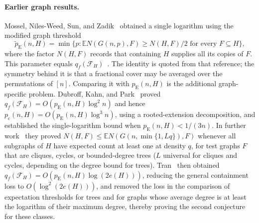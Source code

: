 \documentclass[11pt]{article}
\numberwithin{equation}{section}
\newcommand{\EE}{\mathbb E}
\newcommand{\pc}{p_{\mathrm c}}
\newcommand{\pE}{p_{\mathrm E}}
\begin{document}
\paragraph{Earlier graph results.}
Mossel, Niles-Weed, Sun, and Zadik~\cite[Theorem~1]{MNSZ22} obtained a
single logarithm using the modified graph threshold
\[
 \widetilde p_{\mathrm E}(n,H)
 =\min\{p:\EE N(G(n,p),F)\ge N(H,F)/2
                  \text{ for every }F\subseteq H\},
\]
where the factor $N(H,F)$ records that containing $H$ supplies all its
copies of $F$. This parameter equals
$q_f(\mathcal F_H)$~\cite[Equation~(1)]{DKP25}. The identity is quoted
from that reference; the symmetry behind it is that a fractional cover
may be averaged over the permutations of $[n]$. Comparing it with
$\pE(n,H)$ is the additional graph-specific problem. Dubroff, Kahn, and
Park~\cite[Theorems~1.2--1.5]{DKP25} proved
$q_f(\mathcal F_H)=O(\pE(n,H)\log^2 n)$ and hence
$\pc(n,H)=O(\pE(n,H)\log^3 n)$, using a rooted-extension decomposition,
and established the single-logarithm bound when $\pE(n,H)<1/(3n)$. In
further work~\cite[Theorems~1.4--1.5]{DKP25Cases} they proved
$N(H,F)\le\EE N(G(n,\min\{1,Lq\}),F)$ whenever all subgraphs of $H$ have
expected count at least one at density $q$, for test graphs $F$ that are
cliques, cycles, or bounded-degree trees ($L$ universal for cliques and
cycles, depending on the degree bound for trees). Tran~\cite{Tran26}
then obtained $q_f(\mathcal F_H)=O(\pE(n,H)\log(2e(H)))$, reducing the
general containment loss to $O(\log^2(2e(H)))$, and removed the loss in
the comparison of expectation thresholds for trees and for graphs whose
average degree is at least the logarithm of their maximum degree,
thereby proving the second conjecture for these classes.
\end{document}
